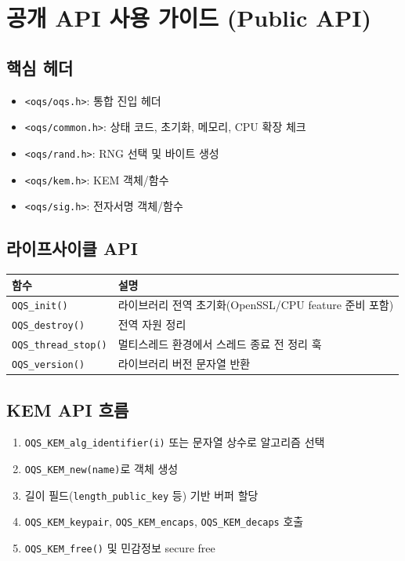 \section{공개 API 사용 가이드 (Public API)}

\subsection{핵심 헤더}
\begin{itemize}[leftmargin=*]
\item \texttt{<oqs/oqs.h>}: 통합 진입 헤더
\item \texttt{<oqs/common.h>}: 상태 코드, 초기화, 메모리, CPU 확장 체크
\item \texttt{<oqs/rand.h>}: RNG 선택 및 바이트 생성
\item \texttt{<oqs/kem.h>}: KEM 객체/함수
\item \texttt{<oqs/sig.h>}: 전자서명 객체/함수
\end{itemize}

\subsection{라이프사이클 API}
\begin{longtable}{p{}p{}}
\toprule
함수 & 설명 \\
\midrule
\texttt{OQS\_init()} & 라이브러리 전역 초기화(OpenSSL/CPU feature 준비 포함) \\
\texttt{OQS\_destroy()} & 전역 자원 정리 \\
\texttt{OQS\_thread\_stop()} & 멀티스레드 환경에서 스레드 종료 전 정리 훅 \\
\texttt{OQS\_version()} & 라이브러리 버전 문자열 반환 \\
\bottomrule
\end{longtable}

\subsection{KEM API 흐름}
\begin{enumerate}[leftmargin=*]
\item \texttt{OQS\_KEM\_alg\_identifier(i)} 또는 문자열 상수로 알고리즘 선택
\item \texttt{OQS\_KEM\_new(name)}로 객체 생성
\item 길이 필드(\texttt{length\_public\_key} 등) 기반 버퍼 할당
\item \texttt{OQS\_KEM\_keypair}, \texttt{OQS\_KEM\_encaps}, \texttt{OQS\_KEM\_decaps} 호출
\item \texttt{OQS\_KEM\_free()} 및 민감정보 secure free
\end{enumerate}

